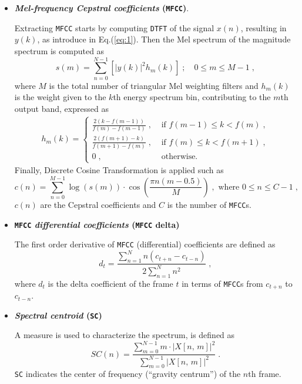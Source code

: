 \documentclass[12pt]{report}
\begin{document}
\begin{itemize}
		\item \textbf{\textit{Mel-frequency Cepstral coefficients} ({\tt MFCC})}.
		\par Extracting {\tt MFCC} starts by computing {\tt DTFT} of the signal $x(n)$, resulting in $y(k)$, as introduce in Eq.(\ref{eq:1}). Then the Mel spectrum of the magnitude spectrum is computed as
		\begin{equation}\label{eq:3}
			s(m) = \sum_{n = 0}^{N - 1} \left[ {|y(k) |}^2 h_m(k) \right] \; ; \quad 0 \le m \le M - 1 \; ,
		\end{equation}
		where $M$ is the total number of triangular Mel weighting filters and $h_m(k)$ is the weight given to the $k$th energy spectrum bin, contributing to the $m$th output band, expressed as
		\begin{align*}
			h_m(k) =
			\begin{cases}
				\frac{2 (k - f (m - 1))}{f(m) - f(m - 1)} \; , &\text{ if } f(m - 1) \le k < f(m) \; , \\
				\frac{2(f (m + 1) - k)}{f(m + 1) - f(m)} \; , &\text{ if } f(m) \le k < f(m + 1) \; , \\
				0 \; , &\text{ otherwise.}
			\end{cases}
		\end{align*}
		Finally, Discrete Cosine Transformation is applied such as
		\begin{equation*}
			c(n) = \sum_{n = 0}^{M - 1} \log{(s(m))} \cdot \cos{\left( \frac{\pi n (m - 0.5)}{M} \right)} \; , \text{ where } 0 \le n \le C - 1 \; ,
		\end{equation*}
		$c(n)$ are the Cepstral coefficients and $C$ is the number of {\tt MFCC}s.
		
		\item \textbf{{\tt MFCC} \textit{differential coefficients} ({\tt MFCC} delta)}
		\par The first order derivative of {\tt MFCC} (differential) coefficients are defined as
		\begin{equation}\label{eq:4}
			d_t = \frac{\sum_{n = 1}^{N} n \left( c_{t + n} - c_{t - n} \right)}{2 \sum_{n = 1}^{N} n^2} \; ,
		\end{equation}
		where $d_t$ is the delta coefficient of the frame $t$ in terms of {\tt MFCC}s from $c_{t + n}$ to $c_{t - n}$.
		
		\item \textbf{\textit{Spectral centroid} ({\tt SC})}
		\par A measure is used to characterize the spectrum, is defined as
		\begin{equation}\label{eq:5}
			SC(n) = \frac{\sum_{m = 0}^{N - 1} m \cdot {|X[n, \, m]|}^2}{\sum_{m = 0}^{N - 1} {|X[n, \, m]|}^2} \; .
		\end{equation}
		{\tt SC} indicates the center of frequency (``gravity centrum'') of the $n$th frame.
		

\end{itemize}
\end{document}
